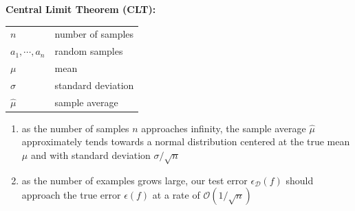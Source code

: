 \textbf{Central Limit Theorem (CLT):}
\begin{table}[H]
    \begin{minipage}{0.29\linewidth}
        \begin{customTableWrapper}{1.5}
        \begin{table}[H]
            \centering
            \begin{tabular}{l l}
                $n$ & number of samples \\
                
                $a_1, \cdots, a_n$ & random samples \\
        
                $\mu$ & mean \\
        
                $\sigma$ & standard deviation \\
        
                $\hat{\mu}$ & sample average \\
            \end{tabular}
        \end{table}
        \end{customTableWrapper}
    \end{minipage}
    \hfill
    \begin{minipage}{0.69\linewidth}
        \begin{enumerate}[itemsep=0.2cm]
            \item as the number of samples $n$ approaches infinity, the sample average $\hat{\mu}$ approximately tends towards a normal distribution centered at the true mean ${\mu}$ and with standard deviation $\sigma/\sqrt{n}$

            \item as the number of examples grows large, our test error $\epsilon_\mathcal{D}(f)$ should approach the true error $\epsilon(f)$ at a rate of $\mathcal{O}(1/\sqrt{n})$

            
        \end{enumerate}
    \end{minipage}
\end{table}

































